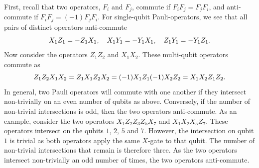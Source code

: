 \documentclass[]{arxiv}
\theoremstyle{plain}%
\theoremstyle{definition}
\theoremstyle{remark}
\begin{document}
First, recall that two operators, $F_i$ and $F_j$, commute if $F_iF_j=F_jF_i$, and anti-commute if $F_iF_j=(-1)F_jF_i$. For single-qubit Pauli-operators, we see that all pairs of distinct operators anti-commute
%
\begin{equation}
X_1Z_1=-Z_1X_1, \quad X_1Y_1=-Y_1X_1, \quad Z_1Y_1=-Y_1Z_1\rm. 	 
\end{equation}
%
Now consider the operators $Z_1Z_2$ and $X_1X_2$. These multi-qubit operators commute as
%
\begin{equation}
Z_1Z_2X_1X_2=Z_1X_1Z_2X_2=(-1)X_1Z_1(-1)X_2Z_2=X_1X_2Z_1Z_2\rm.
\end{equation}
%
In general, two Pauli operators will commute with one another if they intersect non-trivially on an even number of qubits as above. Conversely, if the number of non-trivial intersections is odd, then the two operators anti-commute. As an example, consider the two operators $X_1Z_2Z_3Z_5X_7$ and $X_1X_2X_5Z_7$. These operators intersect on the qubits $1$, $2$, $5$ and $7$. However, the intersection on qubit $1$ is trivial as both operators apply the same $X$-gate to that qubit. The number of non-trivial intersections that remain is therefore three. As the two operators intersect non-trivially an odd number of times, the two operators anti-commute.
\end{document}

